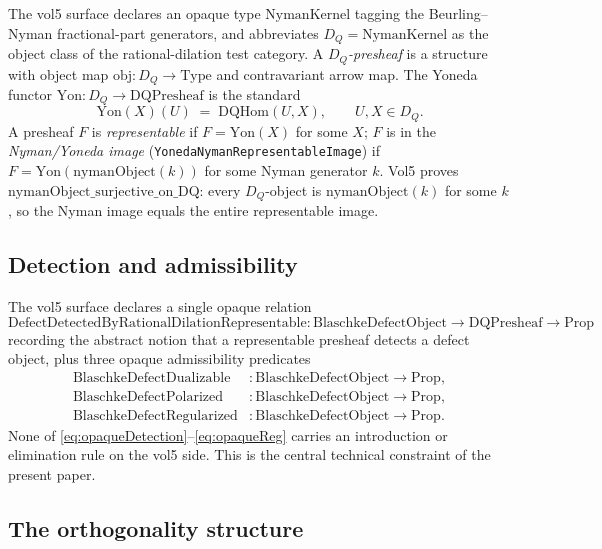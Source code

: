 \documentclass[12pt]{article}
\theoremstyle{definition}
\theoremstyle{remark}
\newcommand{\DQ}{D_{Q}}
\newcommand{\Yon}{\mathrm{Yon}}
\begin{document}
The vol5 surface declares an opaque type $\mathrm{NymanKernel}$ tagging the Beurling--Nyman fractional-part generators, and abbreviates $\DQ = \mathrm{NymanKernel}$ as the object class of the rational-dilation test category. A \emph{$\DQ$-presheaf} is a structure with object map $\mathrm{obj} : \DQ \to \mathrm{Type}$ and contravariant arrow map. The Yoneda functor $\Yon : \DQ \to \mathrm{DQPresheaf}$ is the standard
\begin{equation}\label{eq:yoneda}
  \Yon(X)(U) \;=\; \mathrm{DQHom}(U, X), \qquad U, X \in \DQ.
\end{equation}
A presheaf $F$ is \emph{representable} if $F = \Yon(X)$ for some $X$; $F$ is in the \emph{Nyman/Yoneda image} (\texttt{YonedaNymanRepresentableImage}) if $F = \Yon(\mathrm{nymanObject}(k))$ for some Nyman generator $k$. Vol5 proves $\mathrm{nymanObject\_surjective\_on\_DQ}$: every $\DQ$-object is $\mathrm{nymanObject}(k)$ for some $k$, so the Nyman image equals the entire representable image.

\subsection{Detection and admissibility}

The vol5 surface declares a single opaque relation
\begin{equation}\label{eq:opaqueDetection}
  \mathrm{DefectDetectedByRationalDilationRepresentable}
    : \mathrm{BlaschkeDefectObject} \to \mathrm{DQPresheaf} \to \mathrm{Prop}
\end{equation}
recording the abstract notion that a representable presheaf detects a defect object, plus three opaque admissibility predicates
\begin{align}
  \mathrm{BlaschkeDefectDualizable}  &: \mathrm{BlaschkeDefectObject} \to \mathrm{Prop}, \label{eq:opaqueDual}\\
  \mathrm{BlaschkeDefectPolarized}   &: \mathrm{BlaschkeDefectObject} \to \mathrm{Prop}, \label{eq:opaquePol}\\
  \mathrm{BlaschkeDefectRegularized} &: \mathrm{BlaschkeDefectObject} \to \mathrm{Prop}. \label{eq:opaqueReg}
\end{align}
None of \eqref{eq:opaqueDetection}--\eqref{eq:opaqueReg} carries an introduction or elimination rule on the vol5 side. This is the central technical constraint of the present paper.

\subsection{The orthogonality structure}
\end{document}
